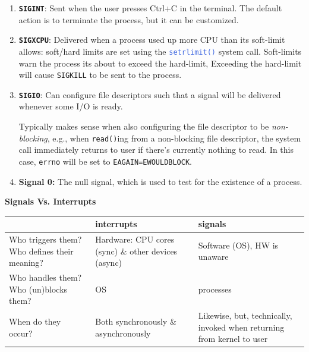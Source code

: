 \documentclass[openany,12pt]{book}
\newcommand{\code}[1]{\texttt{#1}}
\newcommand{\blue}[1]{\textcolor{RoyalBlue}{#1}}
\begin{document}
\begin{enumerate}
  \item \textbf{\code{SIGINT}}: Sent when the user presses Ctrl+C in the terminal. The default action is to terminate the process, but it can be customized.

  \item \textbf{\code{SIGXCPU}}: Delivered when a process used up more CPU than its soft-limit allows: soft/hard limits are set using the \blue{\code{setrlimit()}} system call. Soft-limits warn the process its about to exceed the hard-limit, Exceeding the hard-limit will cause \code{SIGKILL} to be sent to the process.

  \item \textbf{\code{SIGIO}}: Can configure file descriptors such that a signal will be delivered whenever some I/O is ready.

        Typically makes sense when also configuring the file descriptor to be \textit{non-blocking}, e.g., when \code{read()}ing from a non-blocking file descriptor, the system call immediately returns to user if there's currently nothing to read. In this case, \code{errno} will be set to \code{EAGAIN=EWOULDBLOCK}.


  \item \textbf{Signal 0:} The null signal, which is used to test for the existence of a process.
\end{enumerate}


\begin{samepage}
  \begin{center}
    \textbf{Signals Vs. Interrupts}
    \begin{tabular}{|>{\raggedright\arraybackslash}p{4.5cm}|>{\raggedright\arraybackslash}p{5.5cm}|>{\raggedright\arraybackslash}p{5.5cm}|}
      \hline
      \rowcolor{blue!30}
       & \textbf{interrupts}                                                                      & \textbf{signals} \\
      \hline
      Who triggers them? \newline Who defines their meaning?
       & Hardware: \newline CPU cores (sync) \& other devices (async)
       & Software (OS), \newline HW is unaware                                                                       \\
      \hline
      Who handles them? \newline Who (un)blocks them?
       & OS
       & processes                                                                                                   \\
      \hline
      When do they occur?
       & Both synchronously \& asynchronously
       & Likewise, but, technically, \newline invoked when returning \newline from kernel to user                    \\
      \hline
    \end{tabular}
  \end{center}
\end{samepage}
\end{document}
